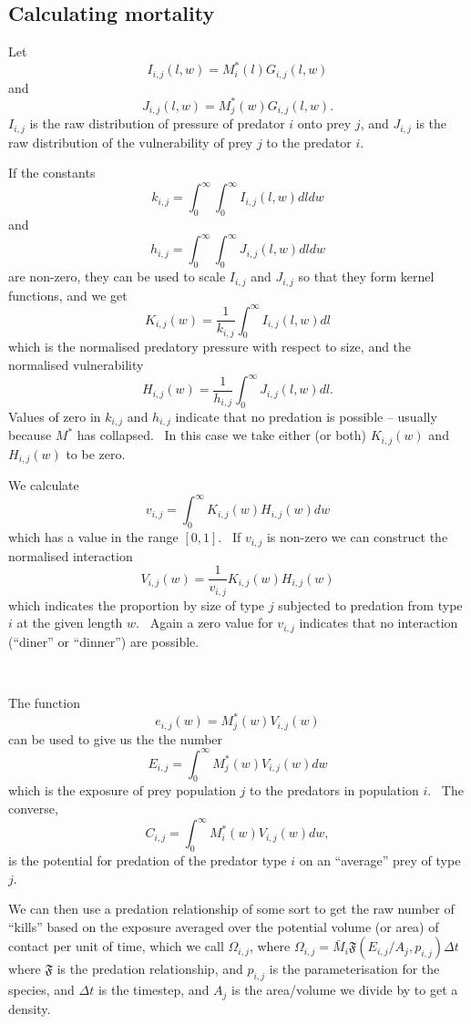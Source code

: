 \subsection{Calculating mortality}

Let
\[ I_{i,j} (l, w) = M^{\ast}_i (l) G_{i,j} (l, w) \]
and
\[ J_{i,j} (l, w) = M^{\ast}_j (w) G_{i,j} (l, w) . \]
$I_{i,j}$ is the raw distribution of pressure of predator $i$ onto prey $j$,
and $J_{i,j}$ is the raw distribution of the vulnerability of prey $j$ to the
predator $i$.

If the constants
\[ k_{i,j} = \int_0^{\infty} \int_0^{\infty} I_{i,j} (l, w) dl dw \]
and
\[ h_{i,j} = \int_0^{\infty} \int_0^{\infty} J_{i,j} (l, w) dl dw \]
are non-zero, they can be used to scale $I_{i,j}$ and $J_{i,j}$ so that they
form kernel functions, and we get
\[ K_{i,j} (w) = \frac{1}{k_{i,j}} \int_0^{\infty} I_{i,j} (l, w) dl \]
which is the normalised predatory pressure with respect to size, and the
normalised vulnerability
\[ H_{i,j} (w) = \frac{1}{h_{i,j}} \int_0^{\infty} J_{i,j} (l, w) dl . \]
Values of zero in $k_{i,j}$ and $h_{i,j}$ indicate that no predation is
possible -- usually because $M^{\ast}$ has collapsed. \ In this case we take
either (or both) $K_{i,j} (w)$ and $H_{i,j} (w)$ to be zero.

We calculate
\[ v_{i,j} = \int_0^{\infty} K_{i,j} (w) H_{i,j} (w) dw \]
which has a value in the range $[0, 1]$. \ If $v_{i,j}$ is non-zero we can
construct the normalised interaction
\[ V_{i,j} (w) = \frac{1}{v_{i,j}} K_{i,j} (w) H_{i,j} (w) \]
which indicates the proportion by size of type $j$ subjected to predation from
type $i$ at the given length $w$. \ Again a zero value for $v_{i,j}$ indicates
that no interaction (``diner'' or ``dinner'') are possible.

\

The function
\[ e_{i,j} (w) = M^{\ast}_j (w) V_{i,j} (w)  \]
can be used to give us the the number
\[ E_{i,j} = \int_0^{\infty} M^{\ast}_j (w) V_{i,j} (w) d w \]
which is the exposure of prey population $j$ to the predators in
population $i$. \ The converse,
\[ C_{i,j} = \int_0^{\infty} M_i^{\ast} (w) V_{i,j} (w) d w, \]
is the potential for predation of the predator type $i$ on an ``average'' prey
of type $j$.

We can then use a predation relationship of some sort to get the raw
number of ``kills'' based on the exposure averaged over the potential
volume (or area) of contact per unit of time, which we call $\Omega_{i,j}$, where $\Omega_{i,j} = \bar{M}_i \mathfrak{F} (E_{i,j} / A_j,
p_{i,j}) \Delta t$ where $\mathfrak{F}$ is the predation relationship,
and $p_{i,j}$ is the parameterisation for the species, and $\Delta t$
is the timestep, and $A_j$ is the area/volume we divide by to get a
density. \

